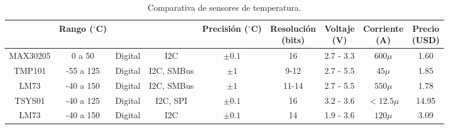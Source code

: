 		\begin{table}[htbp]
			\begin{center}
			\begin{tabular}{|c|c|c|c|c|c|c|c|c|}
				\hline
				\thead{Modelo}&\thead{Rango \\ ($^{\circ}$C)}&\thead{Tipo}&\thead{Interfaz}&\thead{Precisión \\ ($^{\circ}$C)}&\thead{Resolución \\ (bits)}&\thead{Voltaje \\ (V)}&\thead{Corriente \\ (A)}&\thead{Precio \\ (USD)}\\
				\hline
				\hline
				MAX30205 & 0 a 50 & Digital& I2C& $\pm0.1$ &16 & 2.7 - 3.3&$600\mu$&1.60 \\
				\hline
				TMP101 & -55 a 125 & Digital& I2C, SMBus& $\pm1$ &9-12 & 2.7 - 5.5&$45\mu$&1.85 \\
				\hline
				LM73 & -40 a 150 & Digital& I2C, SMBus& $\pm1$ &11-14 & 2.7 - 5.5&$550\mu$&1.78 \\
				\hline
				TSYS01 & -40 a 125 & Digital& I2C, SPI& $\pm0.1$ &16 & 3.2 - 3.6&$< 12.5\mu$&14.95 \\
				\hline
				LM73 & -40 a 150 & Digital& I2C& $\pm0.1$ &14 & 1.9 - 3.6&$120\mu$&3.09 \\
				\hline
			\end{tabular}
			\caption{Comparativa de sensores de temperatura.}
			\label{analisis:sensorTemperatura}
			\end{center}
		\end{table}

